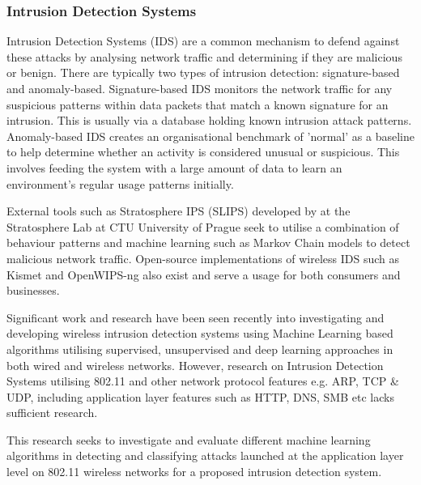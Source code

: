 
\subsubsection{Intrusion Detection Systems}

\smallskip

Intrusion Detection Systems (IDS) are a common mechanism to defend against these attacks by analysing network traffic and determining if they are malicious or benign. There are typically two types of intrusion detection: signature-based and anomaly-based. Signature-based IDS monitors the network traffic for any suspicious patterns within data packets that match a known signature for an intrusion. This is usually via a database holding known intrusion attack patterns. Anomaly-based IDS creates an organisational benchmark of 'normal' as a baseline to help determine whether an activity is considered unusual or suspicious. This involves feeding the system with a large amount of data to learn an environment's regular usage patterns initially. 

External tools such as Stratosphere IPS (SLIPS) developed by \textcite{garcia_2015_slips} at the Stratosphere Lab at CTU University of Prague seek to utilise a combination of behaviour patterns and machine learning such as Markov Chain models to detect malicious network traffic. Open-source implementations of wireless IDS such as Kismet \parencite{kismet_2002_kismet} and OpenWIPS-ng \parencite{thomasdotreppe_2011_openwipsng} also exist and serve a usage for both consumers and businesses.

\medskip
Significant work and research have been seen recently into investigating and developing wireless intrusion detection systems using Machine Learning based algorithms utilising supervised, unsupervised and deep learning approaches in both wired and wireless networks. However, research on Intrusion Detection Systems utilising 802.11 and other network protocol features e.g. ARP, TCP \& UDP, including application layer features such as HTTP, DNS, SMB etc lacks sufficient research.

This research seeks to investigate and evaluate different machine learning algorithms in detecting and classifying attacks launched at the application layer level on 802.11 wireless networks for a proposed intrusion detection system. 

